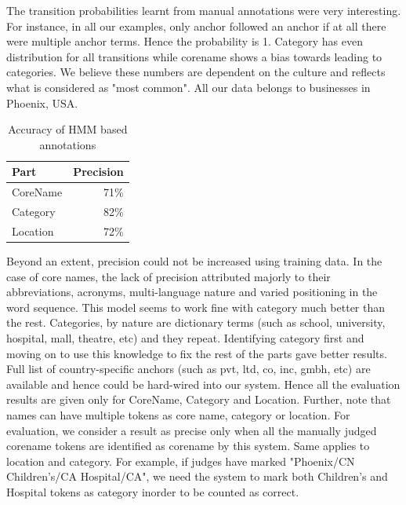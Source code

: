 \documentclass{acm_proc_article-sp}
\begin{document}
The transition probabilities learnt from manual annotations were very interesting. For instance, in all our examples, only anchor followed an anchor if at all there were multiple anchor terms. Hence the probability is 1. Category has even distribution for all transitions while corename shows a bias towards leading to categories. We believe these numbers are dependent on the culture and reflects what is considered as "most common". All our data belongs to businesses in Phoenix, USA.

\begin{table}[!ht]
\begin{center}
\begin{center}
  \begin{tabular}{ | l | r |}
    \hline
    Part & Precision \\ \hline 
    CoreName & 71\%  \\ \hline    
    Category & 82\% \\ \hline
    Location & 72\% \\ \hline 
  \end{tabular}
\end{center}
\end{center}
\caption{
Accuracy of HMM based annotations
}
\label{table}
\end{table}
Beyond an extent, precision could not be increased using training data. In the case of core names, the lack of precision attributed majorly to their abbreviations, acronyms, multi-language nature and varied positioning in the word sequence. This model seems to work fine with category much better than the rest. Categories, by nature are dictionary terms (such as school, university, hospital, mall, theatre, etc) and they repeat. Identifying category first and moving on to use this knowledge to fix the rest of the parts gave better results. Full list of country-specific anchors (such as pvt, ltd, co, inc, gmbh, etc) are available and hence could be hard-wired into our system. Hence all the evaluation results are given only for CoreName, Category and Location. Further, note that names can have multiple tokens as core name, category or location. For evaluation, we consider a result as precise only when all the manually judged corename tokens are identified as corename by this system. Same applies to location and category. For example, if judges have marked "Phoenix/CN Children's/CA Hospital/CA", we need the system to mark both Children's and Hospital tokens as category inorder to be counted as correct.  
\end{document}

